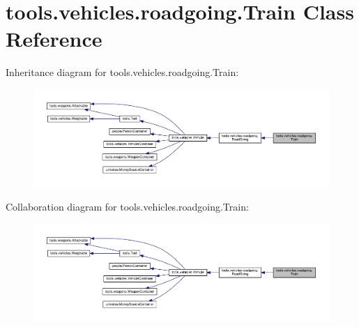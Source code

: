 \hypertarget{classtools_1_1vehicles_1_1roadgoing_1_1_train}{}\section{tools.\+vehicles.\+roadgoing.\+Train Class Reference}
\label{classtools_1_1vehicles_1_1roadgoing_1_1_train}


Inheritance diagram for tools.\+vehicles.\+roadgoing.\+Train\+:
\nopagebreak
\begin{figure}[H]
\begin{center}
\leavevmode
\includegraphics[width=350pt]{classtools_1_1vehicles_1_1roadgoing_1_1_train__inherit__graph}
\end{center}
\end{figure}


Collaboration diagram for tools.\+vehicles.\+roadgoing.\+Train\+:
\nopagebreak
\begin{figure}[H]
\begin{center}
\leavevmode
\includegraphics[width=350pt]{classtools_1_1vehicles_1_1roadgoing_1_1_train__coll__graph}
\end{center}
\end{figure}
